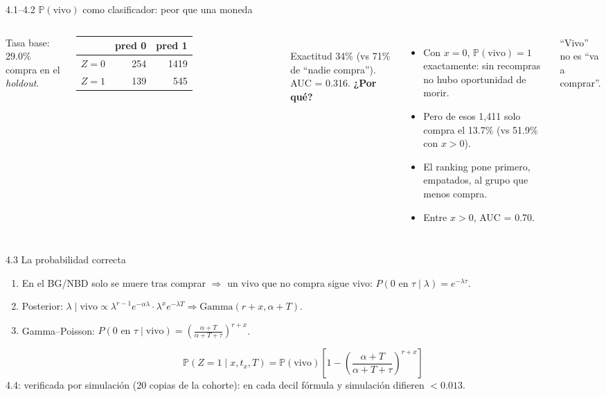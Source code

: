\documentclass[aspectratio=169,10pt]{beamer}
\newcommand{\pvivo}{\mathbb{P}(\text{vivo})}
\begin{document}
\begin{frame}{4.1–4.2 $\pvivo$ como clasificador: peor que una moneda}
\begin{columns}[T]
\small
Tasa base: 29.0\% compra en el \emph{holdout}.\\[0.3em]
\begin{tabular}{lrr}\toprule
 & pred 0 & pred 1\\\midrule
$Z=0$ & 254 & 1419\\
$Z=1$ & 139 & 545\\\bottomrule
\end{tabular}\\[0.3em]
Exactitud 34\% (vs 71\% de ``nadie compra''). \alert{AUC = 0.316}.
\small
\textbf{¿Por qué?}
\begin{itemize}
  \item Con $x=0$, \alert{$\pvivo=1$ exactamente}: sin recompras no hubo oportunidad de morir.
  \item Pero de esos 1{,}411 solo compra el \alert{13.7\%} (vs 51.9\% con $x>0$).
  \item El ranking pone primero, empatados, al grupo que menos compra.
  \item Entre $x>0$, AUC = 0.70.
\end{itemize}
\alert{``Vivo'' no es ``va a comprar''.}
\end{columns}
\end{frame}

\begin{frame}{4.3 La probabilidad correcta}
\begin{enumerate}
  \item En el BG/NBD solo se muere tras comprar $\Rightarrow$ un vivo que no compra sigue vivo: $P(0\text{ en }\tau\mid\lambda)=e^{-\lambda\tau}$.
  \item Posterior: $\lambda\mid\text{vivo}\propto\lambda^{r-1}e^{-\alpha\lambda}\cdot\lambda^xe^{-\lambda T}\Rightarrow\text{Gamma}(r+x,\alpha+T)$.
  \item Gamma–Poisson: $P(0\text{ en }\tau\mid\text{vivo})=\left(\frac{\alpha+T}{\alpha+T+\tau}\right)^{r+x}$.
\end{enumerate}
\[\boxed{\mathbb{P}(Z=1\mid x,t_x,T)=\pvivo\left[1-\left(\frac{\alpha+T}{\alpha+T+\tau}\right)^{r+x}\right]}\]
4.4: verificada por simulación (20 copias de la cohorte): en cada decil fórmula y simulación difieren $<0.013$.
\end{frame}
\end{document}
